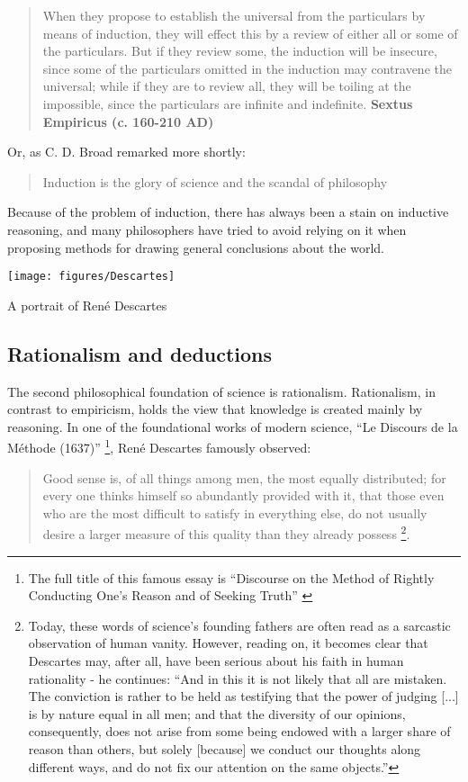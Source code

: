 \documentclass{tufte-book}
\begin{document}
\begin{quote}
When they propose to establish the universal from the particulars by means of induction, they will effect this by a review of either all or some of the particulars. But if they review some, the induction will be insecure, since some of the particulars omitted in the induction may contravene the universal; while if they are to review all, they will be toiling at the impossible, since the particulars are infinite and indefinite. \textbf{Sextus Empiricus (c. 160-210 AD)}
\end{quote}
Or, as C. D. Broad remarked more shortly: 
\begin{quote}
Induction is the glory of science and the scandal of philosophy
\end{quote}

Because of the problem of induction, there has always been a stain on inductive reasoning, and many philosophers have tried to avoid relying on it when proposing methods for drawing general conclusions about the world.

\begin{marginfigure}
\begin{center}
\texttt{[image: figures/Descartes]}
\caption{A portrait of René Descartes}
\label{fig: Descartes}
\end{center}
\end{marginfigure}

\subsection{Rationalism and deductions}

The second philosophical foundation of science is rationalism. Rationalism, in contrast to empiricism, holds the view that knowledge is created mainly by reasoning. In one of the foundational works of modern science, ``Le Discours de la Méthode (1637)''  \footnote{The full title of this famous essay is ``Discourse on the Method of Rightly Conducting One's Reason and of Seeking Truth'' \citep{Descartes-DiscourseMethodRightly-1673}}, René Descartes famously observed: 

\begin{quote}
Good sense is, of all things among men, the most equally distributed; for every one thinks himself so abundantly provided with it, that those even who are the most difficult to satisfy in everything else, do not usually desire a larger measure of this quality than they already possess \footnote{Today, these words of science's founding fathers are often read as a sarcastic observation of human vanity. However, reading on, it becomes clear that Descartes may, after all, have been serious about his faith in human rationality - he continues: ``And in this it is not likely that all are mistaken. The conviction is rather to be held as testifying that the power of judging [...] is by nature equal in all men; and that the diversity of our opinions, consequently, does not arise from some being endowed with a larger share of reason than others, but solely [because] we conduct our thoughts along different ways, and do not fix our attention on the same objects.''}.
\end{quote} 
\end{document}
